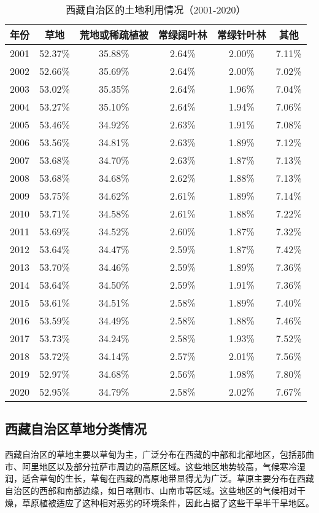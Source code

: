 \documentclass[AutoFakeBold]{LZUThesis-PgD&PhD}
\begin{document}
		
		\begin{table}[H]
			\centering
			\begin{tabular}{|c|c|c|c|c|c|}
				\hline
				年份 & 草地 & 荒地或稀疏植被 & 常绿阔叶林 & 常绿针叶林 & 其他 \\
				\hline
				2001 & 52.37\% & 35.88\% & 2.64\% & 2.00\% & 7.11\% \\
				2002 & 52.66\% & 35.69\% & 2.64\% & 2.00\% & 7.02\% \\
				2003 & 53.02\% & 35.35\% & 2.64\% & 1.96\% & 7.04\% \\
				2004 & 53.27\% & 35.10\% & 2.64\% & 1.94\% & 7.06\% \\
				2005 & 53.46\% & 34.92\% & 2.63\% & 1.91\% & 7.08\% \\
				2006 & 53.56\% & 34.81\% & 2.63\% & 1.89\% & 7.12\% \\
				2007 & 53.68\% & 34.70\% & 2.63\% & 1.87\% & 7.13\% \\
				2008 & 53.68\% & 34.68\% & 2.62\% & 1.88\% & 7.13\% \\
				2009 & 53.75\% & 34.62\% & 2.61\% & 1.89\% & 7.14\% \\
				2010 & 53.71\% & 34.58\% & 2.61\% & 1.88\% & 7.22\% \\
				2011 & 53.69\% & 34.52\% & 2.60\% & 1.87\% & 7.32\% \\
				2012 & 53.64\% & 34.47\% & 2.59\% & 1.87\% & 7.42\% \\
				2013 & 53.70\% & 34.46\% & 2.59\% & 1.89\% & 7.36\% \\
				2014 & 53.64\% & 34.50\% & 2.59\% & 1.91\% & 7.36\% \\
				2015 & 53.61\% & 34.51\% & 2.58\% & 1.89\% & 7.40\% \\
				2016 & 53.59\% & 34.49\% & 2.58\% & 1.88\% & 7.46\% \\
				2017 & 53.73\% & 34.24\% & 2.58\% & 1.93\% & 7.52\% \\
				2018 & 53.72\% & 34.14\% & 2.57\% & 2.01\% & 7.56\% \\
				2019 & 52.97\% & 34.68\% & 2.56\% & 1.98\% & 7.80\% \\
				2020 & 52.95\% & 34.79\% & 2.58\% & 2.02\% & 7.67\% \\
				\hline
			\end{tabular}
			\caption{西藏自治区的土地利用情况（2001-2020）}
		\end{table}


    \subsection{西藏自治区草地分类情况}
    \par 西藏自治区的草地主要以草甸为主，广泛分布在西藏的中部和北部地区，包括那曲市、阿里地区以及部分拉萨市周边的高原区域。这些地区地势较高，气候寒冷湿润，适合草甸的生长，草甸在西藏的高原地带显得尤为广泛。草原主要分布在西藏自治区的西部和南部边缘，如日喀则市、山南市等区域。这些地区的气候相对干燥，草原植被适应了这种相对恶劣的环境条件，因此占据了这些干旱半干旱地区。
\end{document}

